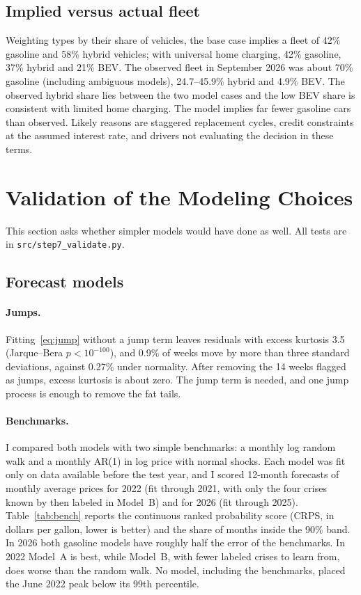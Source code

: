 \documentclass[11pt]{article}
\begin{document}
\subsection{Implied versus actual fleet}

Weighting types by their share of vehicles, the base case implies a fleet of 42\% gasoline and 58\% hybrid vehicles; with universal home charging, 42\% gasoline, 37\% hybrid and 21\% BEV. The observed fleet in September 2026 was about 70\% gasoline (including ambiguous models), 24.7--45.9\% hybrid and 4.9\% BEV. The observed hybrid share lies between the two model cases and the low BEV share is consistent with limited home charging. The model implies far fewer gasoline cars than observed. Likely reasons are staggered replacement cycles, credit constraints at the assumed interest rate, and drivers not evaluating the decision in these terms.

\section{Validation of the Modeling Choices}\label{sec:validation}

This section asks whether simpler models would have done as well. All tests are in \texttt{src/step7\_validate.py}.

\subsection{Forecast models}

\paragraph{Jumps.} Fitting~\eqref{eq:jump} without a jump term leaves residuals with excess kurtosis 3.5 (Jarque--Bera $p < 10^{-100}$), and 0.9\% of weeks move by more than three standard deviations, against 0.27\% under normality. After removing the 14 weeks flagged as jumps, excess kurtosis is about zero. The jump term is needed, and one jump process is enough to remove the fat tails.

\paragraph{Benchmarks.} I compared both models with two simple benchmarks: a monthly log random walk and a monthly AR(1) in log price with normal shocks. Each model was fit only on data available before the test year, and I scored 12-month forecasts of monthly average prices for 2022 (fit through 2021, with only the four crises known by then labeled in Model~B) and for 2026 (fit through 2025). Table~\ref{tab:bench} reports the continuous ranked probability score (CRPS, in dollars per gallon, lower is better) and the share of months inside the 90\% band. In 2026 both gasoline models have roughly half the error of the benchmarks. In 2022 Model~A is best, while Model~B, with fewer labeled crises to learn from, does worse than the random walk. No model, including the benchmarks, placed the June 2022 peak below its 99th percentile.
\end{document}
